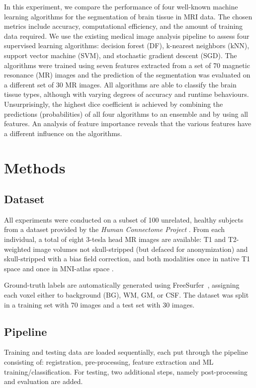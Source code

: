 \documentclass[journal]{IEEEtran}
\begin{document}
In this experiment, we compare the performance of four well-known machine learning algorithms for the segmentation of brain tissue in MRI data. The chosen metrics include accuracy, computational efficiency, and the amount of training data required. We use the existing medical image analysis pipeline to assess four supervised learning algorithms: decision forest (DF), k-nearest neighbors (kNN), support vector machine (SVM), and stochastic gradient descent (SGD). The algorithms were trained using seven features extracted from a set of 70 magnetic resonance (MR) images and the prediction of the segmentation was evaluated on a different set of 30 MR images. All algorithms are able to classify the brain tissue types, although with varying degrees of accuracy and runtime behaviours. Unsurprisingly, the highest dice coefficient is achieved by combining the predictions (probabilities) of all four algorithms to an ensemble and by using all features. An analysis of feature importance reveals that the various features have a different influence on the algorithms.


\section{Methods}

\subsection{Dataset}
All experiments were conducted on a subset of 100 unrelated, healthy subjects from a dataset provided by the \textit{Human Connectome Project} \cite{van2013wu}. From each individual, a total of eight 3-tesla head MR images are available: T1 and T2-weighted image volumes not skull-stripped (but defaced for anonymization) and skull-stripped with a bias field correction, and both modalities once in native T1 space and once in MNI-atlas space \cite{mazziotta2001probabilistic}.

Ground-truth labels are automatically generated using FreeSurfer~\cite{fischl2012freesurfer}, assigning each voxel either to background (BG), WM, GM, or CSF. The dataset was split in a training set with 70 images and a test set with 30 images.

\subsection{Pipeline}\label{s.pipeline}

Training and testing data are loaded sequentially, each put through the pipeline consisting of: registration, pre-processing, feature extraction and ML training/classification. For testing, two additional steps, namely post-processing and evaluation are added.
\end{document}
